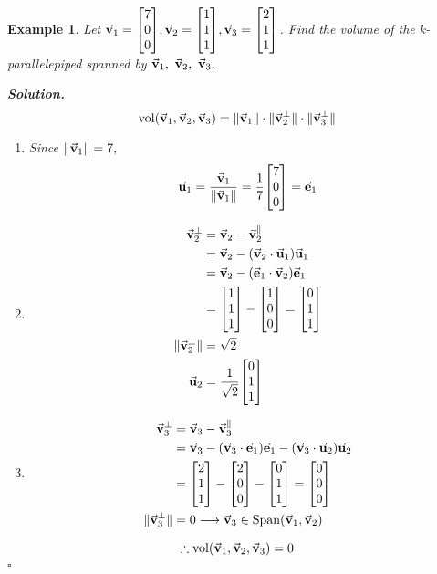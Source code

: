 \documentclass[12pt, a4paper]{article}
\newtheorem{eg}{Example}[subsection]
\newenvironment*{sol}{\par\indent\textbf{\textit{Solution. }}}{\hfill{$\square$}\par}
\def\Span{\mathrm{Span}}
\def\vol{\mathrm{vol}}
\def\vecv{\va{v}}
\def\vecu{\va{u}}
\def\vece{\va{e}}
\begin{document}
\begin{eg}
	Let $\vecv_1=\mqty[{7\\0\\0}],\vecv_2=\mqty[{1\\1\\1}],\vecv_3=\mqty[{2\\1\\1}]$. Find the volume of the k-parallelepiped spanned by $\vecv_1,\ \vecv_2,\ \vecv_3.$
	\begin{sol}
		\[\vol\qty(\vecv_1,\vecv_2,\vecv_3)=\|\vecv_1\|\cdot\|\vecv_2^\perp\|\cdot\|\vecv_3^\perp\|\]
		\begin{enumerate}
			\item Since $\|\vecv_1\|=7,$ \[\vecu_1=\dfrac{\vecv_1}{\|\vecv_1\|}=\dfrac{1}{7}\mqty[{7\\0\\0}]=\vece_1\]
			\item \[\begin{aligned}\vecv_2^\perp&=\vecv_2-\vecv_2^\parallel\\&=\vecv_2-\qty(\vecv_2\cdot\vecu_1)\vecu_1\\&=\vecv_2-\qty(\vece_1\cdot\vecv_2)\vece_1\\&=\mqty[{1\\1\\1}]-\mqty[{1\\0\\0}]=\mqty[{0\\1\\1}]\\\|\vecv_2^\perp\|&=\sqrt{2}\\\vecu_2&=\dfrac{1}{\sqrt{2}}\mqty[0\\1\\1]\end{aligned}\]
			\item \[\begin{aligned}\vecv_3^\perp&=\vecv_3-\vecv_3^\parallel\\&=\vecv_3-\qty(\vecv_3\cdot\vece_1)\vece_1-\qty(\vecv_3\cdot\vecu_2)\vecu_2\\&=\mqty[{2\\1\\1}]-\mqty[{2\\0\\0}]-\mqty[{0\\1\\1}]=\mqty[{0\\0\\0}]\\\|\vecv_3^\perp\|&=0\longrightarrow\vecv_3\in\Span\qty(\vecv_1,\vecv_2)\end{aligned}\]
		\end{enumerate}
		\[\therefore\vol\qty(\vecv_1,\vecv_2,\vecv_3)=0\]
	\end{sol}
\end{eg}
\end{document}
